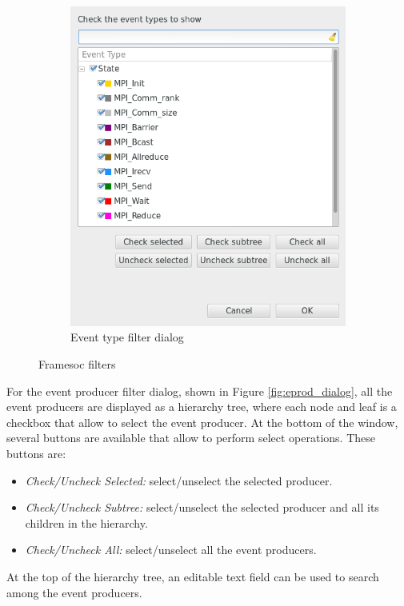 \documentclass[twoside]{article}
\begin{document}
\begin{sloppypar}
\begin{figure}[h!]
\begin{subfigure}[c]{0.46\textwidth}
    \includegraphics[width=1.0\textwidth]{images/event_filter.png}
    \caption{Event type filter dialog}
    \label{fig:etype_dialog}         
 \end{subfigure}
 \caption{Framesoc filters}
 \label{fig:filter_dialog}       
\end{figure}

For the event producer filter dialog, shown in Figure \ref{fig:eprod_dialog}, all the event producers are displayed as a hierarchy tree, where each node and leaf is a checkbox that allow to select the event producer. At the bottom of the window, several buttons are available that allow to perform select operations. These buttons are:
\begin{itemize}
	\item \emph{Check/Uncheck Selected:} select/unselect the selected producer.
	\item \emph{Check/Uncheck Subtree:} select/unselect the selected producer and all its children in the hierarchy.
	\item \emph{Check/Uncheck All:} select/unselect all the event producers. 
\end{itemize}
At the top of the hierarchy tree, an editable text field can be used to search among the event producers.


\end{sloppypar}
\end{document}
